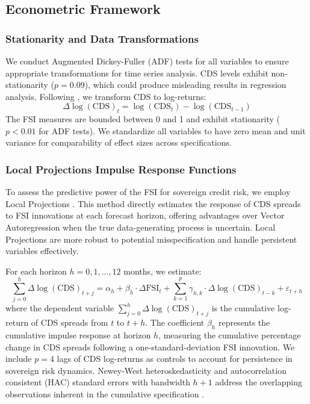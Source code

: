 \subsection{Econometric Framework}

\subsubsection{Stationarity and Data Transformations}

We conduct Augmented Dickey-Fuller (ADF) tests for all variables to ensure appropriate transformations for time series analysis. CDS levels exhibit non-stationarity ($p = 0.09$), which could produce misleading results in regression analysis. Following \cite{hamilton1994time}, we transform CDS to log-returns:
\begin{equation}\label{eq:cds_transform}
    \Delta \log(\text{CDS})_t = \log(\text{CDS}_t) - \log(\text{CDS}_{t-1})
\end{equation}
The FSI measures are bounded between 0 and 1 and exhibit stationarity ($p < 0.01$ for ADF tests). We standardize all variables to have zero mean and unit variance for comparability of effect sizes across specifications.

\subsubsection{Local Projections Impulse Response Functions}

To assess the predictive power of the FSI for sovereign credit risk, we employ Local Projections \citep{jorda2005estimation}. This method directly estimates the response of CDS spreads to FSI innovations at each forecast horizon, offering advantages over Vector Autoregression when the true data-generating process is uncertain. Local Projections are more robust to potential misspecification and handle persistent variables effectively.

For each horizon $h = 0, 1, \ldots, 12$ months, we estimate:
\begin{equation}\label{eq:lp}
    \sum_{j=0}^{h} \Delta \log(\text{CDS})_{t+j} = \alpha_h + \beta_h \cdot \Delta \text{FSI}_t + \sum_{k=1}^{p} \gamma_{h,k} \cdot \Delta \log(\text{CDS})_{t-k} + \varepsilon_{t+h}
\end{equation}
where the dependent variable $\sum_{j=0}^{h} \Delta \log(\text{CDS})_{t+j}$ is the cumulative log-return of CDS spreads from $t$ to $t+h$. The coefficient $\beta_h$ represents the cumulative impulse response at horizon $h$, measuring the cumulative percentage change in CDS spreads following a one-standard-deviation FSI innovation. We include $p = 4$ lags of CDS log-returns as controls to account for persistence in sovereign risk dynamics. Newey-West heteroskedasticity and autocorrelation consistent (HAC) standard errors with bandwidth $h + 1$ address the overlapping observations inherent in the cumulative specification \citep{newey1987simple}.

